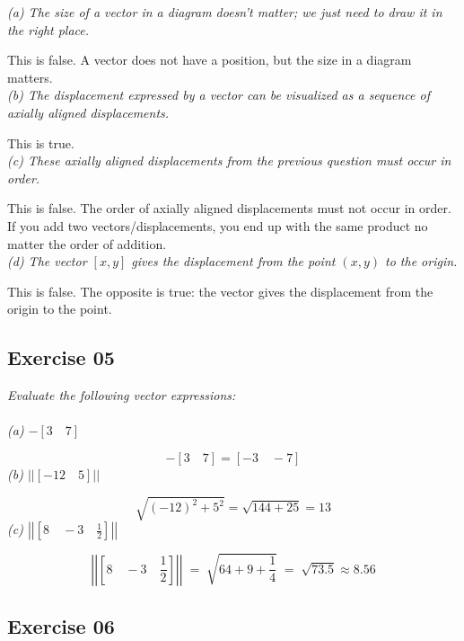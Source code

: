 \documentclass[12pt, a4paper]{article}
\begin{document}
\textit
{
	(a) The size of a vector in a diagram doesn't matter; we just need
	to draw it in the right place.\\
}

This is false. A vector does not have a position, but the size in a diagram matters.\\

\textit
{
	(b) The displacement expressed by a vector can be visualized as a
	sequence of axially aligned displacements.\\
}

This is true.\\

\textit
{
	(c) These axially aligned displacements from the previous question
	must occur in order.\\
}

This is false. The order of axially aligned displacements must not occur in order. If you add two vectors/displacements, you end up with the same product no matter the order of addition.\\

\textit
{
	 (d) The vector $[x, y]$ gives the displacement from the point $(x,
	 y)$ to the origin.\\
}

This is false. The opposite is true: the vector gives the displacement from the origin to the point.\\

\newpage\quad

\subsection*{Exercise 05}

\textit
{
	Evaluate the following vector expressions:\\
}
\textbf{}\\
\textit
{
	(a) \quad $-[3 \quad 7]$\\
}

\begin{equation}
	\tag*{}
	-[3 \quad 7] = [-3 \quad -7]
\end{equation}
\textit
{
	(b) \quad $\left|\left|\left[ -12 \quad 5 \right]\right|\right|$\\
}

\begin{equation}
	\tag*{}
	\sqrt{\left(-12\right)^2 + 5^2} = \sqrt{144 + 25} = 13
\end{equation}
\textit
{
	(c) \quad $\left|\left| \left[ 8 \quad -3 \quad \frac{1}{2} \right]
	\right|\right|$
}

\begin{equation}
	\tag*{}
	\left|\left| \left[ 8 \quad -3 \quad \frac{1}{2} \right]
	\right|\right| \; = \; \sqrt{64 + 9 + \frac{1}{4}} \; = \; \sqrt{73.5}
	\approx 8.56
\end{equation}

\subsection*{Exercise 06}
\end{document}

